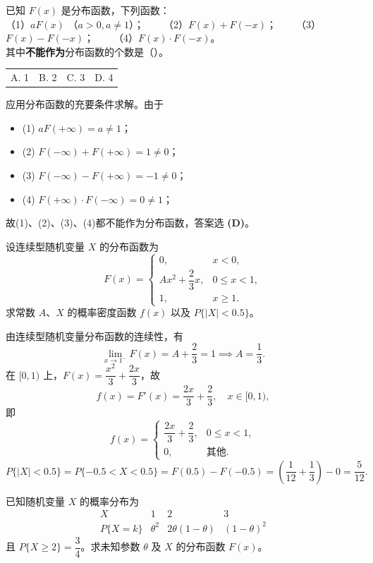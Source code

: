 ﻿\documentclass[lang=cn,11pt]{elegantbook}
\begin{document}
\begin{exercise}[分布函数性质判断] \label{exer:2-32}
已知 $F(x)$ 是分布函数，下列函数：\\
（1）$aF(x)$ （$a>0, a\neq1$）；~~~~（2）$F(x)+F(-x)$；~~~~（3）$F(x)-F(-x)$；~~~~（4）$F(x)\cdot F(-x)$。\\
其中\textbf{不能作为}分布函数的个数是（\quad）。
\begin{tabular}{llll}
A. 1 & B. 2 & C. 3 & D. 4
\end{tabular}
\end{exercise}
\begin{solution}
应用分布函数的充要条件求解。由于
\begin{itemize}
    \item (1) $aF(+\infty)=a\neq1$；
    \item (2) $F(-\infty)+F(+\infty)=1\neq0$；
    \item (3) $F(-\infty)-F(+\infty)=-1\neq0$；
    \item (4) $F(+\infty)\cdot F(-\infty)=0\neq1$；
\end{itemize}
故(1)、(2)、(3)、(4)都不能作为分布函数，答案选 \textbf{(D)}。
\end{solution}


\begin{exercise}\label{exer:2-4}
设连续型随机变量 $X$ 的分布函数为
\[
F(x) = \begin{cases}
0, & x < 0, \\
Ax^2 + \dfrac{2}{3}x, & 0 \le x < 1, \\
1, & x \ge 1.
\end{cases}
\]
求常数 $A$、$X$ 的概率密度函数 $f(x)$ 以及 $P\{|X| < 0.5\}$。
\end{exercise}

\begin{solution}
由连续型随机变量分布函数的连续性，有
\[
\lim_{x \to 1^-} F(x) = A + \frac{2}{3} = 1 \implies A = \frac{1}{3}.
\]
在 $[0,1)$ 上，$F(x) = \dfrac{x^2}{3} + \dfrac{2x}{3}$，故
\[
f(x) = F'(x) = \frac{2x}{3} + \frac{2}{3}, \quad x \in [0,1),
\]
即
\[
f(x) = \begin{cases}
\dfrac{2x}{3} + \dfrac{2}{3}, & 0 \le x < 1, \\
0, & \text{其他}.
\end{cases}
\]
\[
P\{|X| < 0.5\} = P\{-0.5 < X < 0.5\} = F(0.5) - F(-0.5) = \left(\frac{1}{12} + \frac{1}{3}\right) - 0 = \frac{5}{12}.
\]
\end{solution}

\begin{exercise}\label{exer:2-5}
已知随机变量 $X$ 的概率分布为
\[
\begin{array}{c|ccc}
X & 1 & 2 & 3 \\
\hline
P\{X=k\} & \theta^2 & 2\theta(1-\theta) & (1-\theta)^2
\end{array}
\]
且 $P\{X \ge 2\} = \dfrac{3}{4}$。求未知参数 $\theta$ 及 $X$ 的分布函数 $F(x)$。
\end{exercise}
\end{document}
